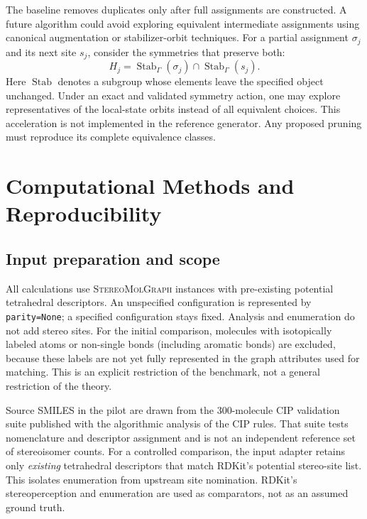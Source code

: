 \documentclass[journal=jcisd8,manuscript=article]{achemso}
\newcommand{\StereoMolGraph}{\textsc{StereoMolGraph}}
\newcommand{\Stab}{\operatorname{Stab}}
\begin{document}
The baseline removes duplicates only after full
assignments are constructed. A future algorithm
could avoid exploring equivalent intermediate
assignments using canonical augmentation or
stabilizer-orbit techniques.\cite{McKay1998}
For a partial assignment $\sigma_j$ and its
next site $s_j$, consider the symmetries
that preserve both:
\begin{equation}
H_j=\Stab_{\Gamma}(\sigma_j)\cap\Stab_{\Gamma}(s_j).
\label{eq:stabilizer}
\end{equation}
Here $\Stab$ denotes a subgroup whose elements
leave the specified object unchanged. Under an
exact and validated symmetry action, one may
explore representatives of the local-state
orbits instead of all equivalent choices.
This acceleration is not implemented in the
reference generator. Any proposed pruning must
reproduce its complete equivalence classes.

\section{Computational Methods and Reproducibility}
\label{sec:methods}

\subsection{Input preparation and scope}

All calculations use \StereoMolGraph{} instances with
pre-existing potential tetrahedral descriptors.
An unspecified configuration is represented by
\texttt{parity=None}; a specified configuration stays
fixed. Analysis and enumeration do not add stereo
sites. For the initial comparison, molecules with
isotopically labeled atoms or non-single bonds
(including aromatic bonds) are excluded, because
these labels are not yet fully represented in the
graph attributes used for matching. This is an
explicit restriction of the benchmark, not a
general restriction of the theory.

Source SMILES in the pilot are drawn from the
300-molecule CIP validation suite published with
the algorithmic analysis of the CIP rules.\cite{Hanson2018}
That suite tests nomenclature and descriptor
assignment and is not an independent reference
set of stereoisomer counts. For a controlled
comparison, the input adapter retains only
\emph{existing} tetrahedral descriptors that
match RDKit's potential stereo-site list.
This isolates enumeration from upstream
site nomination. RDKit's stereoperception
and enumeration are used as comparators,
not as an assumed ground truth.\cite{RDKitBook2026,RDKit2026}
\end{document}
